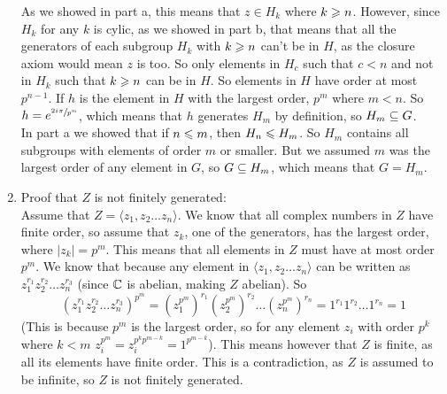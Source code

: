 \documentclass[12pt]{article}
\begin{document}
\begin{enumerate}[label=\textbf{\alph*.}]
            As we showed in part a,
            this means that $z \in H_k$ where $k \geqslant n$.
            However, since $H_k$ for any $k$ is cylic,
            as we showed in part b,
            that means that all the generators of each subgroup $H_k$
            with $k \geqslant n$
            can't be in $H$,
            as the closure axiom would mean $z$ is too.
            So only elements in $H_c$ such that $c < n$
            and not in $H_k$ such that $k \geqslant n$ can be in $H$.
            So elements in $H$ have order at most $p^{n-1}$.
            If $h$ is the element in $H$ with the largest order, $p^m$
            where $m < n$.
            So $h = e^{\sfrac{2i\pi}{p^m}}$,
            which means that $h$ generates $H_m$ by definition,
            so $H_m \subseteq G$. \\
            In part a we showed that if $n \leqslant m$,
            then $H_n \leqslant H_m$.
            So $H_m$ contains all subgroups with elements 
            of order $m$ or smaller.
            But we assumed $m$ was the largest order of any element in $G$,
            so $G \subseteq H_m$,
            which means that $G = H_m$.
        \item
            Proof that $Z$ is not finitely generated: \\
            Assume that $Z = \langle z_1, z_2 \dots z_n \rangle$.
            We know that all complex numbers in $Z$ have finite order,
            so assume that $z_k$, one of the generators,
            has the largest order, where $|z_k| = p^m$.
            This means that all elements in $Z$
            must have at most order $p^m$.
            We know that because any element
            in $\langle z_1, z_2 \dots z_n \rangle$
            can be written as $z_1^{r_1}z_2^{r_2} \dots z_n^{r_3}$
            (since $\mathbb{C}$ is abelian, making $Z$ abelian).
            So
            \[ (z_1^{r_1}z_2^{r_2} \dots z_n^{r_3})^{p^m}
            = (z_1^{p^m})^{r_1}(z_2^{p^m})^{r_2} \dots (z_n^{p^m})^{r_n}
            = 1^{r_1}1^{r_2} \dots 1^{r_n}
            = 1 \]
            (This is because $p^m$ is the largest order,
            so for any element $z_i$ with order $p^k$ where $k < m$
            $z_i^{p^m} = z_i^{p^kp^{m - k}}  = 1^{p^{m - k}}$).
            This means however that $Z$ is finite,
            as all its elements have finite order.
            This is a contradiction,
            as $Z$ is assumed to be infinite,
            so $Z$ is not finitely generated.
    \end{enumerate}

    
\end{document}
